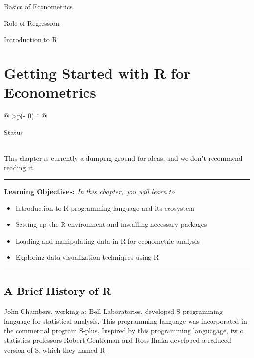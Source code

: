 \documentclass[
  letterpaper,
  paper =a4,
  twoside,
  openright,
  headsepline,
  footsepline,
  listof = totocnumbered,
  chapterprefix = true,
  firstiscover]{scrbook}
\providecommand{\abstractname}{Learning Objectives} %
\newenvironment{objectives}[1]{%
	\hrule
	\vspace{5pt}
	\small\textbf{\abstractname: } 
	\newline
	\vspace{0.1cm}
	\small\emph{#1} %
	\itshape %
}{%
	\vspace{5pt}
	\hrule
	\vspace{0.6cm}
}
\begin{document}
Basics of Econometrics

Role of Regression

Introduction to R


\hypertarget{getting-started-with-r-for-econometrics}{%
\chapter{Getting Started with R for
Econometrics}\label{getting-started-with-r-for-econometrics}}

\begin{longtable}[]{@{}
  >{\centering\arraybackslash}p{(\columnwidth - 0\tabcolsep) * }@{}}
\toprule\noalign{}
\begin{minipage}[b]{\linewidth}\centering
Status
\end{minipage} \\
\midrule\noalign{}
\endhead
\bottomrule\noalign{}
\endlastfoot
This chapter is currently a dumping ground for ideas, and we don't
recommend reading it. \\
\end{longtable}

\begin{objectives}{In this chapter, you will learn to}
\begin{itemize}

\item{Introduction to R programming language and its ecosystem}

\item{Setting up the R environment and installing necessary packages}

\item{Loading and manipulating data in R for econometric analysis}

\item{Exploring data visualization techniques using R}

\end{itemize}

\end{objectives}

\hypertarget{a-brief-history-of-r}{%
\section{A Brief History of R}\label{a-brief-history-of-r}}

John Chambers, working at Bell Laboratories, developed S programming
language for statistical analysis. This programming language was
incorporated in the commercial program S-plus. Inspired by this
programming languagage, tw o statistics professors Robert Gentleman and
Ross Ihaka developed a reduced version of S, which they named R.
\end{document}
